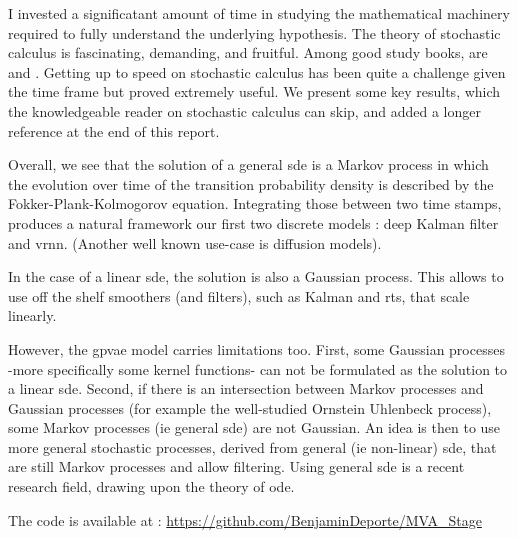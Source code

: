 I invested a significatant amount of time in studying the mathematical machinery required to fully understand the underlying hypothesis. 
The theory of stochastic calculus is fascinating, demanding, and fruitful.
Among good study books, are \cite{mouvement-brownien-calcul-ito} and \cite{sarkka_applied_2019}. 
Getting up to speed on stochastic calculus has been quite a challenge given the time frame but proved extremely useful. 
We present some key results, which the knowledgeable reader on stochastic calculus can skip, and added a longer reference at the end of this report.

Overall, we see that the solution of a general \gls{sde} is a Markov process in which the evolution over time of the transition probability density is described by the Fokker-Plank-Kolmogorov equation. 
Integrating those between two time stamps, produces a natural framework our first two discrete models : deep Kalman filter and \gls{vrnn}.
(Another well known  use-case is diffusion models). 

In the case of a linear \gls{sde}, the solution is also a Gaussian process. This allows to use off the shelf smoothers (and filters), such as Kalman and \gls{rts}, that scale linearly.

However, the \gls{gpvae} model carries limitations too. First, some Gaussian processes -more specifically some kernel functions- can not be formulated as the solution to a linear \gls{sde}.
Second, if there is an intersection between Markov processes and Gaussian processes (for example the well-studied Ornstein Uhlenbeck process), some Markov processes (ie general \gls{sde}) are not Gaussian.
An idea is then to use more general stochastic processes, derived from general (ie non-linear) \gls{sde}, that are still 
Markov processes and allow filtering. Using general \gls{sde} is a recent research field, drawing upon the theory of \gls{ode}.

The code is available at : \url{https://github.com/BenjaminDeporte/MVA_Stage}